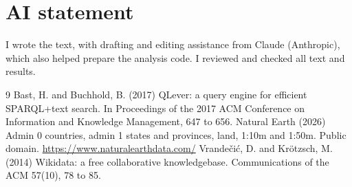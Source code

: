 \documentclass[11pt,a4paper]{article}
\begin{document}
\section*{AI statement}
I wrote the text, with drafting and editing assistance from Claude (Anthropic), which also helped prepare the analysis code. I reviewed and checked all text and results.

\begin{thebibliography}{9}
 Bast, H. and Buchhold, B. (2017) QLever: a query engine for efficient SPARQL+text search. In Proceedings of the 2017 ACM Conference on Information and Knowledge Management, 647 to 656.
 Natural Earth (2026) Admin 0 countries, admin 1 states and provinces, land, 1:10m and 1:50m. Public domain. \url{https://www.naturalearthdata.com/}
 Vrandečić, D. and Krötzsch, M. (2014) Wikidata: a free collaborative knowledgebase. Communications of the ACM 57(10), 78 to 85.
\end{thebibliography}
\end{document}
